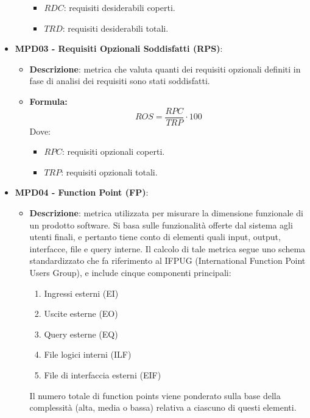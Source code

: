 \documentclass[10pt]{article}
\begin{document}
\begin{justify}
\begin{itemize}
\begin{itemize}
\begin{itemize}
                            \item $RDC$: requisiti desiderabili coperti.
                            \item $TRD$: requisiti desiderabili totali.
                        \end{itemize}
            \end{itemize}
    \item   \textbf{MPD03 - Requisiti Opzionali Soddisfatti (RPS)}:
            \begin{itemize}
                \item   \textbf{Descrizione}: metrica che valuta quanti dei requisiti opzionali definiti in fase di analisi dei requisiti sono stati soddisfatti.
                \item   \textbf{Formula:}
                        \[
                        ROS = \frac{RPC}{TRP} \cdot 100
                        \]
                        Dove:
                        \begin{itemize}
                            \item $RPC$: requisiti opzionali coperti.
                            \item $TRP$: requisiti opzionali totali.
                        \end{itemize}
            \end{itemize}
    \item   \textbf{MPD04 - Function Point (FP)}:
            \begin{itemize}
                \item   \textbf{Descrizione}: metrica utilizzata per misurare la dimensione funzionale di un prodotto software. Si basa sulle funzionalità 
                        offerte dal sistema agli utenti finali, e pertanto tiene conto di elementi quali input, output, interfacce, file e query interne.
                        Il calcolo di tale metrica segue uno schema standardizzato che fa riferimento al IFPUG (International Function Point Users Group), e include 
                        cinque componenti principali:
                        \begin{enumerate}
                            \item Ingressi esterni (EI)
                            \item Uscite esterne (EO)
                            \item Query esterne (EQ)
                            \item File logici interni (ILF)
                            \item File di interfaccia esterni (EIF)
                        \end{enumerate}
                        Il numero totale di function points viene ponderato sulla base della complessità (alta, media o bassa) relativa a ciascuno di questi elementi.


\end{itemize}
\end{itemize}
\end{justify}
\end{document}
